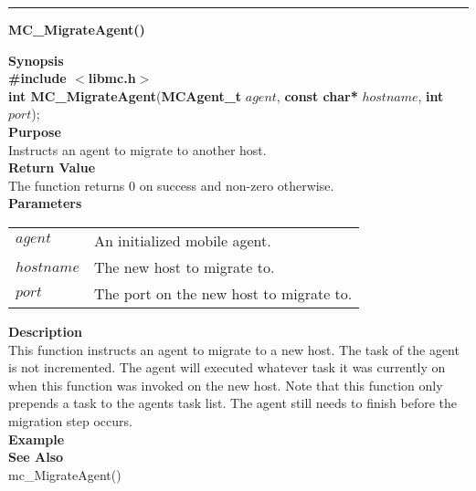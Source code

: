 \noindent
\vspace{5pt}
\rule{6.5in}{0.015in}
\noindent
{}
{\LARGE \bf MC\_MigrateAgent()}\\
\label{api:MC_MigrateAgent()}

\noindent
{\bf Synopsis}\\
{\bf \#include $<$libmc.h$>$}\\
{\bf int MC\_MigrateAgent}({\bf MCAgent\_t} $agent$, {\bf const char*} $hostname$, {\bf int} $port$);\\

\noindent
{\bf Purpose}\\
Instructs an agent to migrate to another host.\\

\noindent
{\bf Return Value}\\
The function returns 0 on success and non-zero otherwise.\\

\noindent
{\bf Parameters}
\vspace{-0.1in}
\begin{description}
\item
\begin{tabular}{p{15 mm}p{145 mm}} 
$agent$ & An initialized mobile agent. \\
$hostname$ & The new host to migrate to. \\
$port$ & The port on the new host to migrate to. \\
\end{tabular}
\end{description}

\noindent
{\bf Description}\\
This function instructs an agent to migrate to a new host. The task of the
agent is not incremented. The agent will executed whatever task it was
currently on when this function was invoked on the new host. Note that this
function only prepends a task to the agents task list. The agent still needs
to finish before the migration step occurs.\\

\noindent
{\bf Example}\\

\noindent
{\bf See Also}\\
mc\_MigrateAgent()

